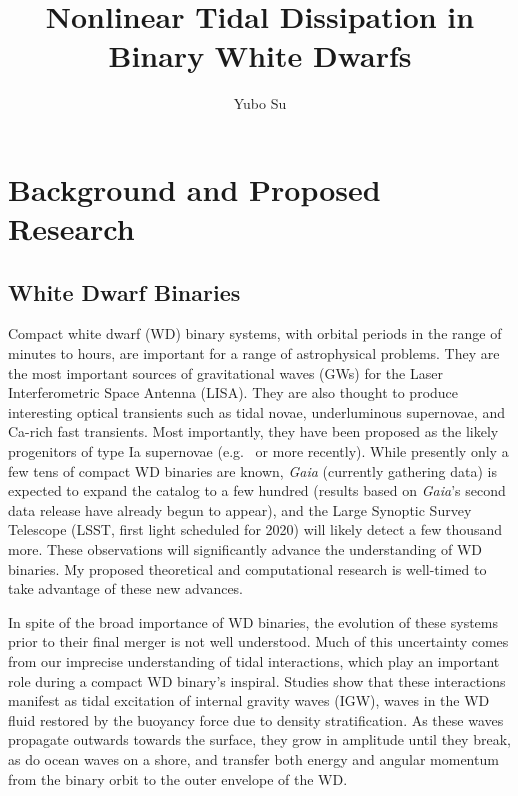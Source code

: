 \documentclass[12pt,
        usenames, %
        dvipsnames %
    ]{article}
\begin{document}
\def\Snospace~{\S{}} %
\renewcommand*{\sectionautorefname}{\Snospace}
\renewcommand*{\appendixautorefname}{\Snospace}
\renewcommand*{\figureautorefname}{Fig.}
\renewcommand*{\equationautorefname}{Eq.}
\renewcommand*{\tableautorefname}{Tab.}

\singlespacing

\pagestyle{fancy}
\rhead{}
\cfoot{\thepage/\pageref{LastPage}}

\title{Nonlinear Tidal Dissipation in Binary White Dwarfs}
\author{Yubo Su}
\date{}

\maketitle

\section{Background and Proposed Research}

\subsection{White Dwarf Binaries}

Compact white dwarf (WD) binary systems, with orbital periods in the range of
minutes to hours, are important for a range of astrophysical problems. They are
the most important sources of gravitational waves (GWs) for the Laser
Interferometric Space Antenna (LISA)\cite{lisa}. They are also thought to
produce interesting optical transients such as tidal novae\cite{tidal_novae},
underluminous supernovae\cite{underlum}, and Ca-rich fast
transients\cite{carich}. Most importantly, they have been proposed as the likely
progenitors of type Ia supernovae (e.g.~\cite{Ia0,webbink} or more
recently\cite{Ia1,Ia2}). While presently only a few tens of compact WD binaries
are known\cite{lsst_wd}, \emph{Gaia} (currently gathering data) is expected to
expand the catalog to a few hundred\cite{lsst_wd} (results based on
\emph{Gaia}'s second data release have already begun to
appear\cite{gaiaDD,gaiaDD2}), and the Large Synoptic Survey Telescope (LSST,
first light scheduled for 2020) will likely detect a few thousand
more\cite{lsst_wd}. These observations will significantly advance the
understanding of WD binaries. My proposed theoretical and computational research
is well-timed to take advantage of these new advances.

In spite of the broad importance of WD binaries, the evolution of these systems
prior to their final merger is not well understood. Much of this uncertainty
comes from our imprecise understanding of tidal interactions, which play an
important role during a compact WD binary's inspiral\cite{fullerII}. Studies
show that these interactions manifest as tidal excitation of internal gravity
waves (IGW), waves in the WD fluid restored by the buoyancy force due to density
stratification\cite{fullerI}. As these waves propagate outwards towards the
surface, they grow in amplitude until they break, as do ocean waves on a shore,
and transfer both energy and angular momentum from the binary orbit to the outer
envelope of the WD\cite{fullerI,fullerII}.
\end{document}
